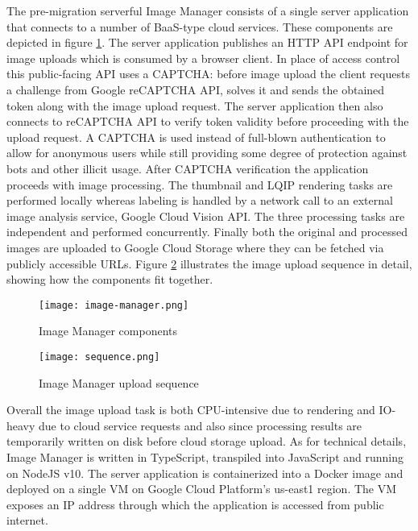 The pre-migration serverful Image Manager consists of a single server application that connects to a number of BaaS-type cloud services. These components are depicted in figure \ref{fig:serverfulArchitecture}. The server application publishes an HTTP API endpoint for image uploads which is consumed by a browser client. In place of access control this public-facing API uses a CAPTCHA: before image upload the client requests a challenge from Google reCAPTCHA API, solves it and sends the obtained token along with the image upload request. The server application then also connects to reCAPTCHA API to verify token validity before proceeding with the upload request. A CAPTCHA is used instead of full-blown authentication to allow for anonymous users while still providing some degree of protection against bots and other illicit usage. After CAPTCHA verification the application proceeds with image processing. The thumbnail and LQIP rendering tasks are performed locally whereas labeling is handled by a network call to an external image analysis service, Google Cloud Vision API. The three processing tasks are independent and performed concurrently. Finally both the original and processed images are uploaded to Google Cloud Storage where they can be fetched via publicly accessible URLs. Figure \ref{fig:serverfulSequence} illustrates the image upload sequence in detail, showing how the components fit together.

\begin{figure}[h]
  \centering
  \texttt{[image: image-manager.png]}
  \caption{Image Manager components}
  \label{fig:serverfulArchitecture}
\end{figure}

\begin{figure}[h]
  \centering
  \texttt{[image: sequence.png]}
  \caption{Image Manager upload sequence}
  \label{fig:serverfulSequence}
\end{figure}

Overall the image upload task is both CPU-intensive due to rendering and IO-heavy due to cloud service requests and also since processing results are temporarily written on disk before cloud storage upload. As for technical details, Image Manager is written in TypeScript, transpiled into JavaScript and running on NodeJS v10. The server application is containerized into a Docker image and deployed on a single VM on Google Cloud Platform's us-east1 region. The VM exposes an IP address through which the application is accessed from public internet.

